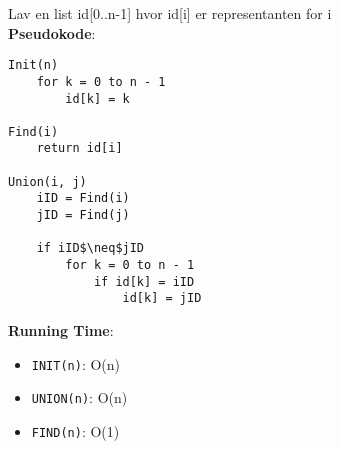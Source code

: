 Lav en list id[0..n-1] hvor id[i] er representanten for i\\
\textbf{Pseudokode}:
\begin{lstlisting}[frame=single, mathescape=true]
Init(n)
	for k = 0 to n - 1
		id[k] = k

Find(i)
	return id[i]

Union(i, j)
	iID = Find(i)
	jID = Find(j)

	if iID$\neq$jID
		for k = 0 to n - 1
			if id[k] = iID
				id[k] = jID
\end{lstlisting}
\textbf{Running Time}:
\begin{itemize}
	\item \texttt{INIT(n)}: O(n)
	\item \texttt{UNION(n)}: O(n)
	\item \texttt{FIND(n)}: O(1)
\end{itemize}